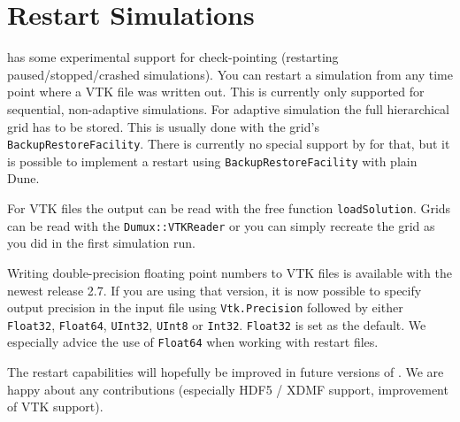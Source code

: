 \section{Restart \Dumux Simulations}
\label{sc_restartsimulations}

\Dumux has some experimental support for check-pointing (restarting paused/stopped/crashed simulations).
You can restart a \Dumux simulation from any time point where a VTK file was written out.
This is currently only supported for sequential, non-adaptive simulations. For adaptive simulation
the full hierarchical grid has to be stored. This is usually done with the grid's \texttt{BackupRestoreFacility}.
There is currently no special support by \Dumux for that, but it is possible to implement
a restart using \texttt{BackupRestoreFacility} with plain Dune.

For VTK files the output can be read with the free function \texttt{loadSolution}. Grids can be read with
the \texttt{Dumux::VTKReader} or you can simply recreate the grid as you did in the first simulation run.

Writing double-precision floating point numbers to VTK files is available with the newest \Dune release 2.7. If you are using that version, it is now possible to specify output precision in the input file using \texttt{Vtk.Precision} followed by either \texttt{Float32}, \texttt{Float64}, \texttt{UInt32}, \texttt{UInt8} or \texttt{Int32}. \texttt{Float32} is set as the default. We especially advice the use of \texttt{Float64} when working with restart files. %

The restart capabilities will hopefully be improved in future versions of .
We are happy about any contributions (especially HDF5 / XDMF support, improvement of VTK support).

